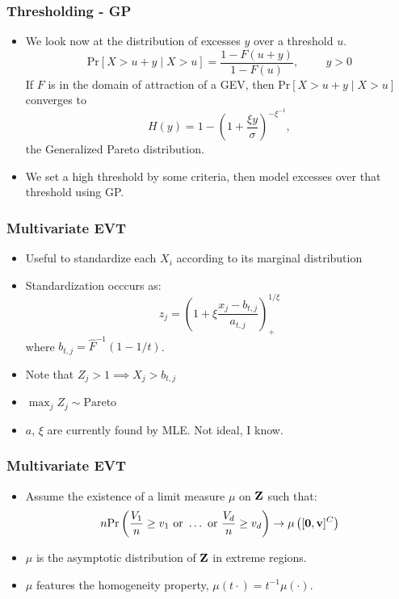 \documentclass[aspectratio=169]{beamer}
\begin{document}
\begin{frame}
  \frametitle{Thresholding - GP}
  \begin{itemize}
    \item We look now at the distribution of excesses $y$ over a threshold $u$.
      \begin{equation*}
        \text{Pr}[X > u + y \mid X > u] = \frac{1 - F(u + y)}{1 - F(u)}, \hspace{1cm}y > 0
      \end{equation*}
      If $F$ is in the domain of attraction of a GEV, then $\text{Pr}[X > u + y \mid X > u]$ converges to
      \begin{equation*}
        H(y) = 1 - \left(1 + \frac{\xi y}{\sigma}\right)^{-\xi^{-1}},
      \end{equation*}
      the Generalized Pareto distribution.
      \item We set a high threshold by some criteria, then model excesses over that threshold using GP.
  \end{itemize}
\end{frame}

\begin{frame}
  \frametitle{Multivariate EVT}
  \begin{itemize}
    \item Useful to standardize each $X_i$ according to its marginal distribution
    \item Standardization occcurs as:
      \begin{equation}
        z_j = \left(1 + \xi\frac{x_j - b_{t,j}}{a_{t,j}}\right)_{+}^{1/\xi}
      \end{equation}
			where $b_{t,j} = \hat{F}^{-1}(1 - 1/t)$. 
    \item Note that $Z_j > 1\implies X_j > b_{t,j}$
    \item $\max_j Z_j \sim \text{Pareto}$
		\item $a$, $\xi$ are currently found by MLE.  Not ideal, I know.
  \end{itemize}
\end{frame}

\begin{frame}
  \frametitle{Multivariate EVT}
  \begin{itemize}
    \item Assume the existence of a limit measure $\mu$ on ${\bf Z}$ such that:
    \begin{equation*}
      n\text{Pr}\left(\frac{V_1}{n} \geq v_1 \text{ or }\ldots\text{ or }\frac{V_d}{n}\geq v_d\right)
      \rightarrow \mu\left([{\bf 0}, {\bf v}]^C\right)
    \end{equation*}
    \item $\mu$ is the asymptotic distribution of ${\bf Z}$ in extreme regions.
    \item $\mu$ features the homogeneity property, $\mu(t\cdot) = t^{-1}\mu(\cdot)$.
  \end{itemize}
\end{frame}
\end{document}
